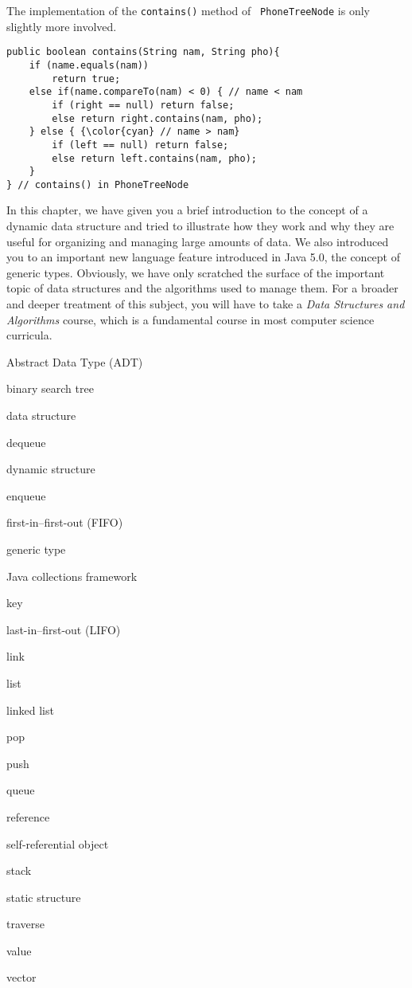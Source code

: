 \noindent The implementation of the {\tt contains()} method of {\tt
PhoneTreeNode} is only slightly more involved.

\begin{jjjlisting}
\begin{lstlisting}
public boolean contains(String nam, String pho){
    if (name.equals(nam))
        return true;
    else if(name.compareTo(nam) < 0) { // name < nam
        if (right == null) return false;
        else return right.contains(nam, pho);
    } else { {\color{cyan} // name > nam}
        if (left == null) return false;
        else return left.contains(nam, pho);
    }
} // contains() in PhoneTreeNode
\end{lstlisting}
\end{jjjlisting}

\pagebreak
{}


In this chapter, we have given you a brief introduction to the concept of a
dynamic data structure and tried to illustrate how they work and why
they are useful for organizing and managing large amounts of data. We
also introduced you to an important new language feature introduced in
Java 5.0, the concept of generic types.  Obviously, we have only
scratched the surface of the important topic of data structures and
the algorithms used to manage them.  For a broader and deeper
treatment of this subject, you will have to take a {\em Data
Structures and Algorithms} course, which is a fundamental course in
most computer science curricula.

\begin{KT}
Abstract Data Type (ADT)

binary search tree

data structure

dequeue

dynamic structure

enqueue

first-in--first-out (FIFO)

generic type

Java collections framework

key

last-in--first-out (LIFO)

link

list

linked list

pop

push

queue

reference

self-referential object

stack

static structure

traverse

value

vector

\end{KT}

